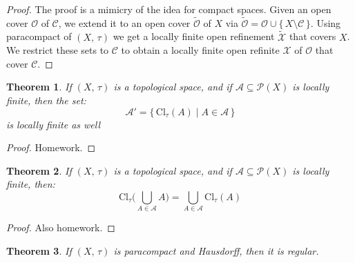 \documentclass{article}
\theoremstyle{plain}
\newtheorem{theorem}{Theorem}[section]
\theoremstyle{normal}
\begin{document}
        \begin{proof}
            The proof is a mimicry of the idea for compact spaces. Given an
            open cover $\mathcal{O}$ of $\mathcal{C}$, we extend it to an open
            cover $\tilde{\mathcal{O}}$ of $X$ via
            $\tilde{\mathcal{O}}=\mathcal{O}\cup\{\,X\setminus\mathcal{C}\,\}$.
            Using paracompact of $(X,\,\tau)$ we get a locally finite open
            refinement $\tilde{\mathcal{X}}$ that covers $X$. We restrict these
            sets to $\mathcal{C}$ to obtain a locally finite open refinite
            $\mathcal{X}$ of $\mathcal{O}$ that cover $\mathcal{C}$.
        \end{proof}
        \begin{theorem}
            If $(X,\,\tau)$ is a topological space, and if
            $\mathcal{A}\subseteq\mathcal{P}(X)$ is locally finite, then the
            set:
            \begin{equation}
                \mathcal{A}'=\{\,\textrm{Cl}_{\tau}(A)\;|\;A\in\mathcal{A}\,\}
            \end{equation}
            is locally finite as well
        \end{theorem}
        \begin{proof}
            Homework.
        \end{proof}
        \begin{theorem}
            If $(X,\,\tau)$ is a topological space, and if
            $\mathcal{A}\subseteq\mathcal{P}(X)$ is locally finite, then:
            \begin{equation}
                \textrm{Cl}_{\tau}\Big(\bigcup_{A\in\mathcal{A}}A\big)
                =\bigcup_{A\in\mathcal{A}}\textrm{Cl}_{\tau}(A)
            \end{equation}
        \end{theorem}
        \begin{proof}
            Also homework.
        \end{proof}
        \begin{theorem}
            If $(X,\,\tau)$ is paracompact and Hausdorff, then it is regular.
        \end{theorem}
\end{document}
